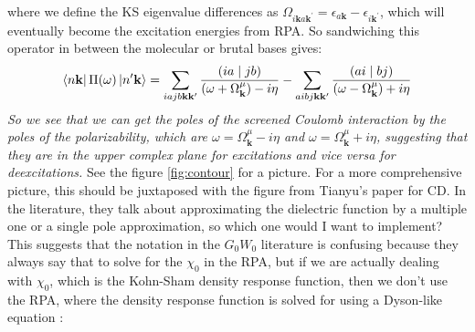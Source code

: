 where we define the KS eigenvalue differences as \(\Omega_{i\mathbf{k}a\mathbf{k}^{\prime}} = \epsilon_{a\mathbf{k}} - \epsilon_{i\mathbf{k}^{\prime}}\), which will eventually become the excitation energies from RPA. So sandwiching this operator in between the molecular or brutal bases gives:
\begin{equation}
    \bra{n\mathbf{k}} \Pi (\omega) \ket{n^\prime\mathbf{k}} = \sum_{iajb \mathbf{k} \mathbf{k}^{\prime}} \frac{(ia\mid jb)}{(\omega + \Omega ^{\mu}_{\mathbf{k}})-i\eta} - \sum_{aibj \mathbf{k} \mathbf{k}^{\prime}} \frac{(ai\mid bj)}{(\omega - \Omega ^{\mu}_{\mathbf{k}})+i\eta}
\end{equation}
\emph{So we see that we can get the poles of the screened Coulomb interaction by the poles of the polarizability, which are \(\omega = \Omega ^{\mu}_{\mathbf{k}} - i\eta\) and \(\omega = \Omega ^{\mu}_{\mathbf{k}} + i\eta\), suggesting that they are in the upper complex plane for excitations and vice versa for deexcitations.} See the figure \ref{fig:contour} for a picture. For a more comprehensive picture, this should be juxtaposed with the figure from Tianyu's paper for CD. In the literature, they talk about approximating the dielectric function by a multiple one or a single pole approximation, so which one would I want to implement? This suggests that the notation in the \(G_0W_0\) literature is confusing because they always say that to solve for the \(\chi_0\) in the RPA, but if we are actually dealing with \(\chi_0\), which is the Kohn-Sham density response function, then we don't use the RPA, where the density response function is solved for using a Dyson-like equation \cite{Sander2015-xq}:
